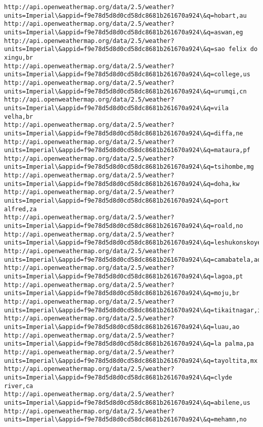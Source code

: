 \documentclass[11pt]{article}
\begin{document}
\begin{Verbatim}[commandchars=\\\{\}]
http://api.openweathermap.org/data/2.5/weather?units=Imperial\&appid=f9e78d5d8d0cd58dc8681b261670a924\&q=hobart,au
http://api.openweathermap.org/data/2.5/weather?units=Imperial\&appid=f9e78d5d8d0cd58dc8681b261670a924\&q=aswan,eg
http://api.openweathermap.org/data/2.5/weather?units=Imperial\&appid=f9e78d5d8d0cd58dc8681b261670a924\&q=sao felix do xingu,br
http://api.openweathermap.org/data/2.5/weather?units=Imperial\&appid=f9e78d5d8d0cd58dc8681b261670a924\&q=college,us
http://api.openweathermap.org/data/2.5/weather?units=Imperial\&appid=f9e78d5d8d0cd58dc8681b261670a924\&q=urumqi,cn
http://api.openweathermap.org/data/2.5/weather?units=Imperial\&appid=f9e78d5d8d0cd58dc8681b261670a924\&q=vila velha,br
http://api.openweathermap.org/data/2.5/weather?units=Imperial\&appid=f9e78d5d8d0cd58dc8681b261670a924\&q=diffa,ne
http://api.openweathermap.org/data/2.5/weather?units=Imperial\&appid=f9e78d5d8d0cd58dc8681b261670a924\&q=mataura,pf
http://api.openweathermap.org/data/2.5/weather?units=Imperial\&appid=f9e78d5d8d0cd58dc8681b261670a924\&q=tsihombe,mg
http://api.openweathermap.org/data/2.5/weather?units=Imperial\&appid=f9e78d5d8d0cd58dc8681b261670a924\&q=doha,kw
http://api.openweathermap.org/data/2.5/weather?units=Imperial\&appid=f9e78d5d8d0cd58dc8681b261670a924\&q=port alfred,za
http://api.openweathermap.org/data/2.5/weather?units=Imperial\&appid=f9e78d5d8d0cd58dc8681b261670a924\&q=roald,no
http://api.openweathermap.org/data/2.5/weather?units=Imperial\&appid=f9e78d5d8d0cd58dc8681b261670a924\&q=leshukonskoye,ru
http://api.openweathermap.org/data/2.5/weather?units=Imperial\&appid=f9e78d5d8d0cd58dc8681b261670a924\&q=camabatela,ao
http://api.openweathermap.org/data/2.5/weather?units=Imperial\&appid=f9e78d5d8d0cd58dc8681b261670a924\&q=lagoa,pt
http://api.openweathermap.org/data/2.5/weather?units=Imperial\&appid=f9e78d5d8d0cd58dc8681b261670a924\&q=moju,br
http://api.openweathermap.org/data/2.5/weather?units=Imperial\&appid=f9e78d5d8d0cd58dc8681b261670a924\&q=tikaitnagar,in
http://api.openweathermap.org/data/2.5/weather?units=Imperial\&appid=f9e78d5d8d0cd58dc8681b261670a924\&q=luau,ao
http://api.openweathermap.org/data/2.5/weather?units=Imperial\&appid=f9e78d5d8d0cd58dc8681b261670a924\&q=la palma,pa
http://api.openweathermap.org/data/2.5/weather?units=Imperial\&appid=f9e78d5d8d0cd58dc8681b261670a924\&q=tayoltita,mx
http://api.openweathermap.org/data/2.5/weather?units=Imperial\&appid=f9e78d5d8d0cd58dc8681b261670a924\&q=clyde river,ca
http://api.openweathermap.org/data/2.5/weather?units=Imperial\&appid=f9e78d5d8d0cd58dc8681b261670a924\&q=abilene,us
http://api.openweathermap.org/data/2.5/weather?units=Imperial\&appid=f9e78d5d8d0cd58dc8681b261670a924\&q=mehamn,no

\end{Verbatim}
\end{document}
